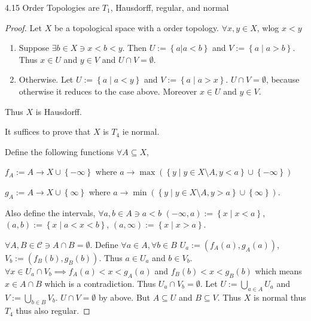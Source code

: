 \documentclass{article}
\begin{document}
\begin{claim}{4.15}\label{Claim 4.15.}
    Order Topologies are $T_1$, Hausdorff, regular, and normal  
\end{claim}
\begin{proof}
    Let $X$ be a topological space with a order topology. $\forall x, y \in X$, wlog $x < y$
    
    \begin{enumerate}
        \item Suppose $\exists b \in X \ni x < b < y$. Then $U := \left\{ a | a < b \right\}$ and $V := \left\{ a \mid a > b \right\}$. Thus $x \in U$ and $y \in V$ and $U \cap V = \emptyset$. 
        \item Otherwise. Let $U := \left\{ a \mid a < y \right\}$ and $V := \left\{ a \mid a > x \right\}$. $U \cap V = \emptyset$, because otherwise it reduces to the case above. Moreover $x \in U$ and $y \in V$.         
    \end{enumerate}

    Thus $X$ is Hausdorff. 
    
    It suffices to prove that $X$ is $T_4$ ie normal. 
    
    Define the following functions $\forall A \subseteq X$, 

    $f_A := A \to X \cup \left\{ -\infty \right\}$ where $a \to \max(\left\{ y \mid y \in X \setminus A, y < a \right\} \cup \left\{ -\infty \right\})$ 
    
    $g_A := A \to X \cup \left\{ \infty \right\}$ where $a \to \min(\left\{ y \mid y \in X \setminus A, y > a \right\} \cup \left\{ \infty \right\})$.
    
    Also define the intervals, $\forall a, b \in A \ni a < b$  $(-\infty, a) := \left\{ x \mid x < a \right\}$, $(a, b) := \left\{ x \mid a < x < b \right\}$, $(a, \infty) := \left\{ x \mid x > a \right\}$.

    $\forall A, B \in \mathcal{C} \ni A \cap B = \emptyset$. Define $\forall a \in A, \forall b \in B$  $U_a := (f_A(a), g_A(a))$, $V_b := (f_B(b), g_B(b))$. Thus $a \in U_a$ and $b \in V_b$. $\forall x \in U_a \cap V_b \implies f_A(a) < x < g_A(a)$ and $f_B(b) < x < g_B(b)$ which means $x \in A \cap B$ which is a contradiction. Thus $U_a \cap V_b = \emptyset$. Let $U := \bigcup_{a \in A} U_a$ and $V := \bigcup_{b \in B} V_b$. $U \cap V = \emptyset$ by above. But $A \subseteq U$ and $B \subseteq V$. Thus $X$ is normal thus $T_4$ thus also regular.             
\end{proof}
\end{document}
